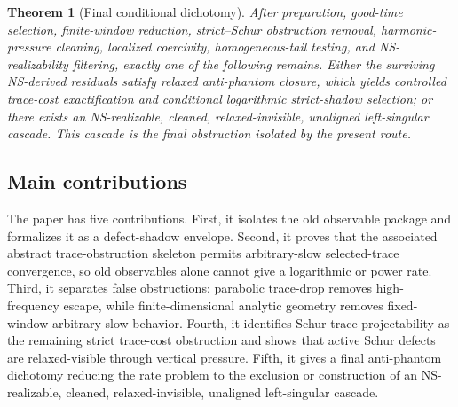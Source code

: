 \documentclass[11pt]{article}
\numberwithin{equation}{section}
\newtheorem{theorem}{Theorem}[section]
\begin{document}
\begin{theorem}[Final conditional dichotomy]
After preparation, good-time selection, finite-window reduction, strict--Schur obstruction removal, harmonic-pressure cleaning, localized coercivity, homogeneous-tail testing, and NS-realizability filtering, exactly one of the following remains. Either the surviving NS-derived residuals satisfy relaxed anti-phantom closure, which yields controlled trace-cost exactification and conditional logarithmic strict-shadow selection; or there exists an NS-realizable, cleaned, relaxed-invisible, unaligned left-singular cascade. This cascade is the final obstruction isolated by the present route.
\end{theorem}

\subsection{Main contributions}
The paper has five contributions.
First, it isolates the old observable package and formalizes it as a defect-shadow envelope. Second, it proves that the associated abstract trace-obstruction skeleton permits arbitrary-slow selected-trace convergence, so old observables alone cannot give a logarithmic or power rate. Third, it separates false obstructions: parabolic trace-drop removes high-frequency escape, while finite-dimensional analytic geometry removes fixed-window arbitrary-slow behavior. Fourth, it identifies Schur trace-projectability as the remaining strict trace-cost obstruction and shows that active Schur defects are relaxed-visible through vertical pressure. Fifth, it gives a final anti-phantom dichotomy reducing the rate problem to the exclusion or construction of an NS-realizable, cleaned, relaxed-invisible, unaligned left-singular cascade.
\end{document}
